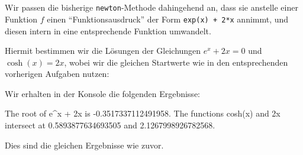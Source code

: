 \section{}

Wir passen die bisherige \texttt{newton}-Methode dahingehend an, dass sie anstelle einer Funktion $f$ einen \enquote{Funktionsausdruck} der Form \texttt{exp(x) + 2*x} annimmt, und diesen intern in eine entsprechende Funktion umwandelt.



Hiermit bestimmen wir die Lösungen der Gleichungen $e^x + 2x = 0$ und $\cosh(x) = 2x$, wobei wir die gleichen Startwerte wie in den entsprechenden vorherigen Aufgaben nutzen:



Wir erhalten in der Konsole die folgenden Ergebnisse:

\begin{consoleoutput}
The root of e^x + 2x is -0.3517337112491958.
The functions cosh(x) and 2x intersect at 0.5893877634693505 and 2.1267998926782568.
\end{consoleoutput}

Dies sind die gleichen Ergebnisse wie zuvor.
